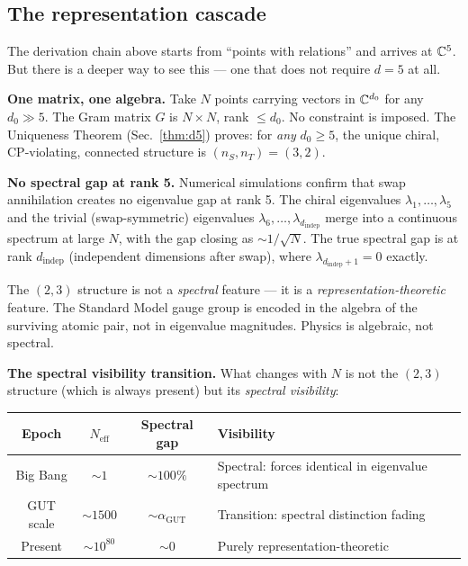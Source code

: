 \subsection{The representation cascade}

The derivation chain above starts from ``points with relations'' and arrives at $\mathbb{C}^5$. But there is a deeper way to see this --- one that does not require $d = 5$ at all.

\textbf{One matrix, one algebra.} Take $N$ points carrying vectors in $\mathbb{C}^{d_0}$ for any $d_0 \gg 5$. The Gram matrix $G$ is $N \times N$, rank $\leq d_0$. No constraint is imposed. The Uniqueness Theorem (Sec.~\ref{thm:d5}) proves: for \emph{any} $d_0 \geq 5$, the unique chiral, CP-violating, connected structure is $(n_S, n_T) = (3, 2)$.

\textbf{No spectral gap at rank 5.} Numerical simulations confirm that swap annihilation creates no eigenvalue gap at rank 5. The chiral eigenvalues $\lambda_1, \ldots, \lambda_5$ and the trivial (swap-symmetric) eigenvalues $\lambda_6, \ldots, \lambda_{d_\text{indep}}$ merge into a continuous spectrum at large $N$, with the gap closing as $\sim 1/\sqrt{N}$. The true spectral gap is at rank $d_\text{indep}$ (independent dimensions after swap), where $\lambda_{d_\text{indep}+1} = 0$ exactly.

The $(2,3)$ structure is not a \emph{spectral} feature --- it is a \emph{representation-theoretic} feature. The Standard Model gauge group is encoded in the algebra of the surviving atomic pair, not in eigenvalue magnitudes. Physics is algebraic, not spectral.

\textbf{The spectral visibility transition.} What changes with $N$ is not the $(2,3)$ structure (which is always present) but its \emph{spectral visibility}:

\begin{center}
\begin{tabular}{cccl}
\hline
Epoch & $N_\text{eff}$ & Spectral gap & Visibility \\
\hline
Big Bang & $\sim 1$ & $\sim 100\%$ & Spectral: forces identical in eigenvalue spectrum \\
GUT scale & $\sim 1500$ & $\sim \alpha_\text{GUT}$ & Transition: spectral distinction fading \\
Present & $\sim 10^{80}$ & $\sim 0$ & Purely representation-theoretic \\
\hline
\end{tabular}
\end{center}

